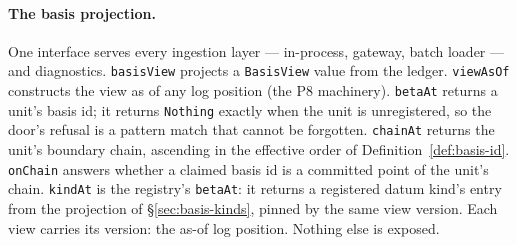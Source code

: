 \paragraph{The basis projection.} One interface serves every ingestion layer ---
in-process, gateway, batch loader --- and diagnostics. \texttt{basisView} projects a
\texttt{BasisView} value from the ledger. \texttt{viewAsOf} constructs the view as of
any log position (the P8 machinery). \texttt{betaAt} returns a unit's basis id; it
returns \texttt{Nothing} exactly when the unit is unregistered, so the door's refusal
is a pattern match that cannot be forgotten. \texttt{chainAt} returns the unit's
boundary chain, ascending in the effective order of Definition~\ref{def:basis-id}.
\texttt{onChain} answers whether a claimed basis id is a committed point of the
unit's chain. \texttt{kindAt} is the registry's \texttt{betaAt}: it returns a
registered datum kind's entry from the projection of \S\ref{sec:basis-kinds}, pinned
by the same view version. Each view carries its version: the as-of log position.
Nothing else is exposed.

